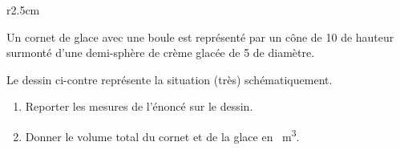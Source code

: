 
\begin{exercice}\label{exosmath-0095}

\begin{wrapfigure}{r}{2.5cm}
   \vspace{-0.5cm}        %
   \centering
   
\end{wrapfigure}

    Un cornet de glace avec une boule est représenté par un cône de \unit{10}{\centi\meter} de hauteur surmonté d'une demi-sphère de crème glacée de \unit{5}{\centi\meter} de diamètre.

    Le dessin ci-contre représente la situation (très) schématiquement.

    \begin{enumerate}
        \item
            Reporter les mesures de l'énoncé sur le dessin.
        \item
            Donner le volume total du cornet et de la glace en \si{\centi\cubic\meter}.
    \end{enumerate}

\end{exercice}
